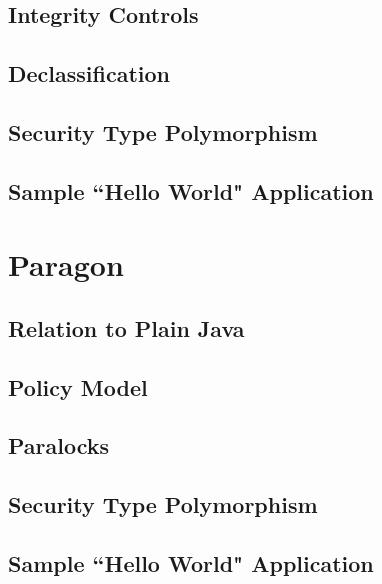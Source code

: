\subsection{Integrity Controls}

\subsection{Declassification}

\subsection{Security Type Polymorphism}

\subsection{Sample ``Hello World" Application}

\section{Paragon}

\subsection{Relation to Plain Java}

\subsection{Policy Model}

\subsection{Paralocks}

\subsection{Security Type Polymorphism}

\subsection{Sample ``Hello World" Application}